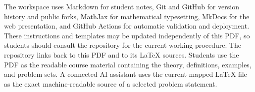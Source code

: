The workspace uses Markdown for student notes, Git and GitHub for version
history and public forks, MathJax for mathematical typesetting, MkDocs for the
web presentation, and GitHub Actions for automatic validation and deployment.
These instructions and templates may be updated independently of this PDF, so
students should consult the repository for the current working procedure. The
repository links back to this PDF and to its LaTeX sources. Students use the
PDF as the readable course material containing the theory, definitions,
examples, and problem sets. A connected AI assistant uses the current mapped
LaTeX file as the exact machine-readable source of a selected problem
statement.
